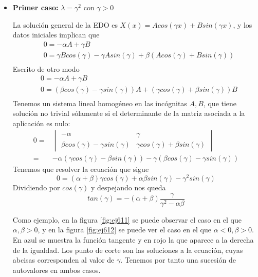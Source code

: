 \begin{itemize}
\item \textbf{Primer caso:} $\lambda=\gamma^2$ con $\gamma > 0$

La solución general de la EDO es $X(x) = Acos(\gamma x)+Bsin(\gamma x)$, y los datos iniciales implican que
\begin{align*}
& 0 = -\alpha A+\gamma B\\
& 0 = \gamma B cos(\gamma) - \gamma Asin(\gamma)+\beta (Acos(\gamma)+Bsin(\gamma))\\
\end{align*}
Escrito de otro modo
\begin{align*}
& 0 = -\alpha A+\gamma B\\
& 0 = \left(\beta cos(\gamma)-\gamma sin(\gamma)\right)A+\left(\gamma cos(\gamma)+\beta sin(\gamma)\right)B\\
\end{align*}
Tenemos un sistema lineal homogéneo en las incógnitas $A,B$, que tiene solución no trivial sólamente si el determinante de la matriz asociada a la aplicación es nulo:
\begin{align*}
0=&\begin{vmatrix}-\alpha & \gamma \\ \beta cos(\gamma)-\gamma sin(\gamma) & \gamma cos(\gamma) +\beta sin(\gamma)\end{vmatrix}\\
 = & -\alpha(\gamma cos(\gamma)-\beta sin(\gamma) )-\gamma(\beta cos(\gamma) -\gamma sin(\gamma))
\end{align*}
Tenemos que resolver la ecuación que sigue
$$0=(\alpha+\beta)\gamma cos(\gamma) +\alpha\beta sin(\gamma)-\gamma^2sin(\gamma)$$
Dividiendo por $cos(\gamma)$ y despejando nos queda
$$tan(\gamma) = -(\alpha+\beta)\frac{\gamma}{\gamma^2-\alpha\beta}$$

Como ejemplo, en la figura \ref{fig:ej611} se puede observar el caso en el que $\alpha, \beta > 0$, y en la figura \ref{fig:ej612} se puede ver el caso en el que $\alpha < 0, \beta > 0$. En azul se muestra la función tangente y en rojo la que aparece a la derecha de la igualdad. Los punto de corte son las soluciones a la ecuación, cuyas abcisas corresponden al valor de $\gamma$. Tenemos por tanto una sucesión de autovalores en ambos casos. 
\end{itemize}

